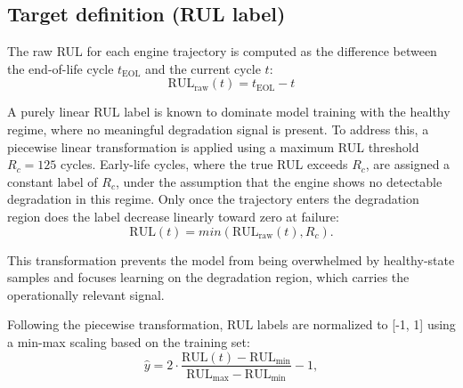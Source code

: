 





\subsection{Target definition (RUL label)}
The raw RUL for each engine trajectory is computed as the difference between the end-of-life cycle $t_{\text{EOL}}$ and the current cycle $t$:
\begin{equation}
    \text{RUL}_{\text{raw}}(t) = t_{\text{EOL}} - t
\end{equation}

A purely linear RUL label is known to dominate model training with the healthy regime, where no meaningful degradation signal is present. To address this, a piecewise linear transformation is applied using a maximum RUL threshold $R_c = \text{125}$ cycles. Early-life cycles, where the true RUL exceeds $R_c$, are assigned a constant label of $R_c$, under the assumption that the engine shows no detectable degradation in this regime. Only once the trajectory enters the degradation region does the label decrease linearly toward zero at failure:
\begin{equation}
    \text{RUL}(t) = min(\text{RUL}_{\text{raw}}(t), R_c).
\end{equation}

This transformation prevents the model from being overwhelmed by healthy-state samples and focuses learning on the degradation region, which carries the operationally relevant signal.

Following the piecewise transformation, RUL labels are normalized to [-1, 1] using a min-max scaling based on the training set:
\begin{equation}
    \hat{y} = 2 \cdot \frac{\text{RUL}(t) - \text{RUL}_{\text{min}}}{\text{RUL}_{\text{max}} - \text{RUL}_{\text{min}}} - 1,
\end{equation}

